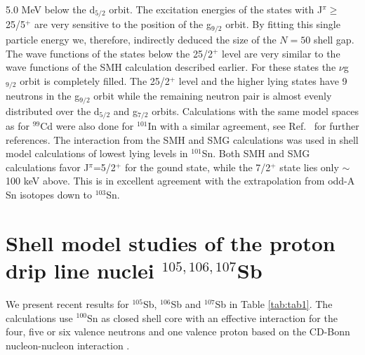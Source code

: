 5.0 MeV below the d$_{5/2}$ orbit. The excitation energies of the
states with J$^\pi$$\geq$25/5$^+$ are very sensitive to the position
of the g$_{9/2}$ orbit. By fitting this single particle energy we,
therefore, indirectly deduced the size of the $N=50$ shell gap.
The wave functions of the states below the 25/2$^+$ level are very
similar to the wave functions of the SMH calculation described
earlier. For these states the $\nu$g$_{9/2}$ orbit is completely filled.
The 25/2$^+$ level and the higher lying states have 9 neutrons in the
g$_{9/2}$ orbit while the remaining neutron pair is almost
evenly distributed over the d$_{5/2}$ and g$_{7/2}$ orbits.
Calculations with the same model spaces as for $^{99}$Cd were
also done for $^{101}$In with a similar agreement, see Ref.~\cite{matej}
for further references.
The interaction from the SMH and SMG calculations
was used in shell model calculations of lowest lying
levels in $^{101}$Sn.
Both SMH and SMG calculations favor J$^{\pi}$=5/2$^+$ for the gound state,
while the 7/2$^+$ state lies only $\sim$100 keV above. This is in excellent
agreement with the extrapolation from odd-A Sn isotopes down to
$^{103}$Sn.

\section{Shell model studies of the proton drip line nuclei 
$^{105,106,107}$Sb}


We present recent results for $^{105}$Sb, $^{106}$Sb and $^{107}$Sb in
Table \ref{tab:tab1}. The calculations use $^{100}$Sn as
closed shell core with an effective 
interaction for the four, five or six valence neutrons and one valence proton
based on the CD-Bonn nucleon-nucleon interaction \cite{cdbonn}.

